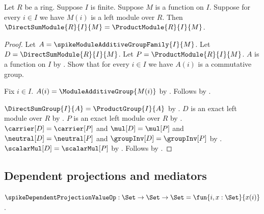 \begin{theorem}\label{spike_finite_direct_sum_module_eq_product_module}
    Let $R$ be a ring.
    Suppose $I$ is finite.
    Suppose $M$ is a function on $I$.
    Suppose for every $i\in I$ we have $M(i)$ is a left module over $R$.
    Then
        $\DirectSumModule{R}{I}{M}=\ProductModule{R}{I}{M}$.
\end{theorem}
\begin{proof}
    Let $A=\spikeModuleAdditiveGroupFamily{I}{M}$.
    Let $D=\DirectSumModule{R}{I}{M}$.
    Let $P=\ProductModule{R}{I}{M}$.
    $A$ is a function on $I$ by
        .
    Show that for every $i\in I$ we have
        $A(i)$ is a commutative group.
    \begin{subproof}
        Fix $i\in I$.
        $A(i)=\ModuleAdditiveGroup{M(i)}$ by
            .
        Follows by .
    \end{subproof}
    $\DirectSumGroup{I}{A}=\ProductGroup{I}{A}$ by
        .
    $D$ is an exact left module over $R$ by
        .
    $P$ is an exact left module over $R$ by
        .
    $\carrier[D]=\carrier[P]$ and $\mul[D]=\mul[P]$ and
        $\neutral[D]=\neutral[P]$ and
        $\groupInv[D]=\groupInv[P]$ by
        .
    $\scalarMul[D]=\scalarMul[P]$ by
        .
    Follows by
        .
\end{proof}

\subsection{Dependent projections and mediators}

\begin{definition}\label{spike_dependent_projection_value_op}
    $\spikeDependentProjectionValueOp:\Set\to\Set\to\Set
        =\fun{i,x:\Set}{x(i)}$.
\end{definition}

